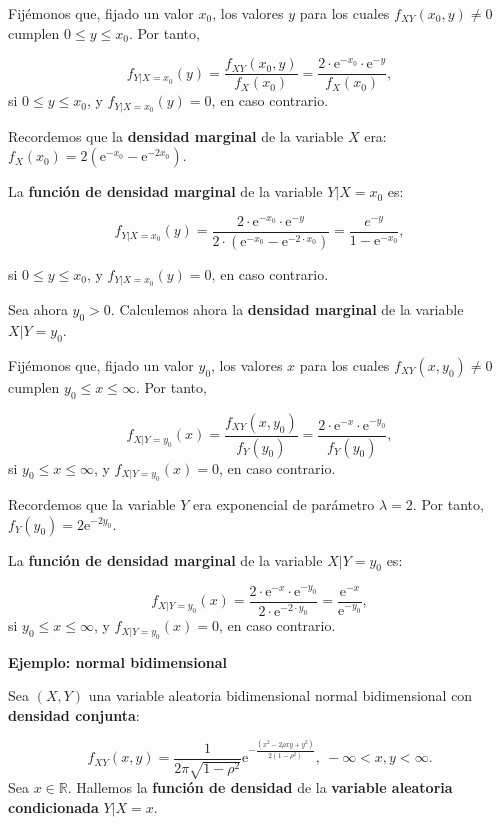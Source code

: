 \documentclass[]{book}
\begin{document}
Fijémonos que, fijado un valor \(x_0\), los valores \(y\) para los cuales \(f_{XY}(x_0,y)\neq 0\) cumplen \(0\leq y\leq x_0\).
Por tanto,

\[
f_{Y|X=x_0}(y)=\frac{f_{XY}(x_0,y)}{f_X(x_0)}=\frac{2\cdot \mathrm{e}^{-x_0}\cdot \mathrm{e}^{-y}}{f_X(x_0)},
\]
si \(0\leq y\leq x_0\), y \(f_{Y|X=x_0}(y)=0\), en caso contrario.

Recordemos que la \textbf{densidad marginal} de la variable \(X\) era: \(f_X(x_0)=2\left(\mathrm{e}^{-x_0}-\mathrm{e}^{-2x_0}\right)\).

La \textbf{función de densidad marginal} de la variable \(Y|X=x_0\) es:

\[
f_{Y|X=x_0}(y)=\frac{2\cdot \mathrm{e}^{-x_0}\cdot \mathrm{e}^{-y}}{2\cdot \left(\mathrm{e}^{-x_0}-\mathrm{e}^{-2\cdot x_0}\right)}=\frac{e^{-y}}{1-\mathrm{e}^{-x_0}},
\]

si \(0\leq y\leq x_0\), y \(f_{Y|X=x_0}(y)=0\), en caso contrario.

Sea ahora \(y_0>0\). Calculemos ahora la \textbf{densidad marginal} de la variable \(X|Y=y_0\).

Fijémonos que, fijado un valor \(y_0\), los valores \(x\) para los cuales \(f_{XY}(x,y_0)\neq 0\) cumplen \(y_0\leq x\leq \infty\). Por tanto,

\[
f_{X|Y=y_0}(x)=\frac{f_{XY}(x,y_0)}{f_Y(y_0)}=\frac{2\cdot \mathrm{e}^{-x}\cdot \mathrm{e}^{-y_0}}{f_Y(y_0)},
\]
si \(y_0\leq x\leq \infty\), y \(f_{X|Y=y_0}(x)=0\), en caso contrario.

Recordemos que la variable \(Y\) era exponencial de parámetro \(\lambda=2\). Por tanto, \(f_Y(y_0)=2\mathrm{e}^{-2y_0}\).

La \textbf{función de densidad marginal} de la variable \(X|Y=y_0\) es:

\[
f_{X|Y=y_0}(x)=\frac{2\cdot \mathrm{e}^{-x}\cdot \mathrm{e}^{-y_0}}{2\cdot \mathrm{e}^{-2\cdot y_0}}=\frac{\mathrm{e}^{-x}}{\mathrm{e}^{-y_0}},
\]
si \(y_0\leq x\leq \infty\), y \(f_{X|Y=y_0}(x)=0\), en caso contrario.

\textbf{Ejemplo: normal bidimensional}

Sea \((X,Y)\) una variable aleatoria bidimensional normal bidimensional con \textbf{densidad conjunta}:

\[
f_{XY}(x,y)=\frac{1}{2\pi\sqrt{1-\rho^2}}\mathrm{e}^{-\frac{(x^2-2\rho xy+y^2)}{2(1-\rho^2)}},\ -\infty <x,y<\infty.
\]
Sea \(x\in\mathbb{R}\). Hallemos la \textbf{función de densidad} de la \textbf{variable aleatoria condicionada} \(Y|X=x\).
\end{document}
